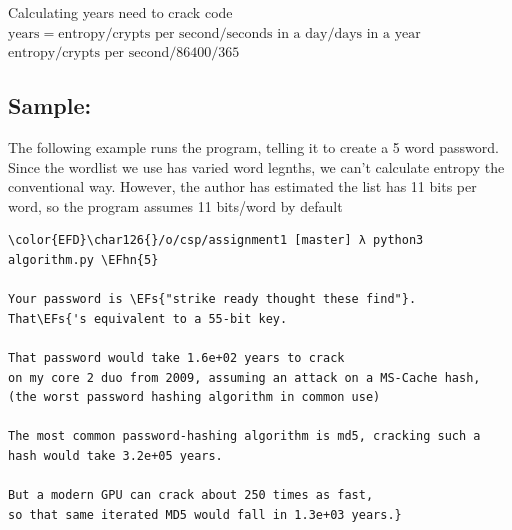 \documentclass{scrartcl}
\newcommand{\EFs}[1]{\textcolor{EFs}{#1}} %
\newcommand{\EFhn}[1]{\textcolor{EFhn}{\textbf{#1}}} %
\begin{document}
Calculating years need to crack code
\(\text{years}=\text{entropy}/\text{crypts per second}/\text{seconds in a day}/\text{days in a year}\)
\(\text{entropy}/\text{crypts per second}/86400/365\)

\subsection{Sample:}
\label{sec:org2858264}
The following example runs the program, telling it to create a 5 word password.
Since the wordlist we use has varied word legnths, we can't calculate entropy
the conventional way. However, the author has estimated the list has 11 bits per
word, so the program assumes 11 bits/word by default
\begin{Code}
\begin{Verbatim}[]
\color{EFD}\char126{}/o/csp/assignment1 [master] λ python3 algorithm.py \EFhn{5}

Your password is \EFs{"strike ready thought these find"}.
That\EFs{'s equivalent to a 55-bit key.

That password would take 1.6e+02 years to crack
on my core 2 duo from 2009, assuming an attack on a MS-Cache hash,
(the worst password hashing algorithm in common use)

The most common password-hashing algorithm is md5, cracking such a hash would take 3.2e+05 years.

But a modern GPU can crack about 250 times as fast,
so that same iterated MD5 would fall in 1.3e+03 years.}
\end{Verbatim}
\end{Code}
\end{document}
